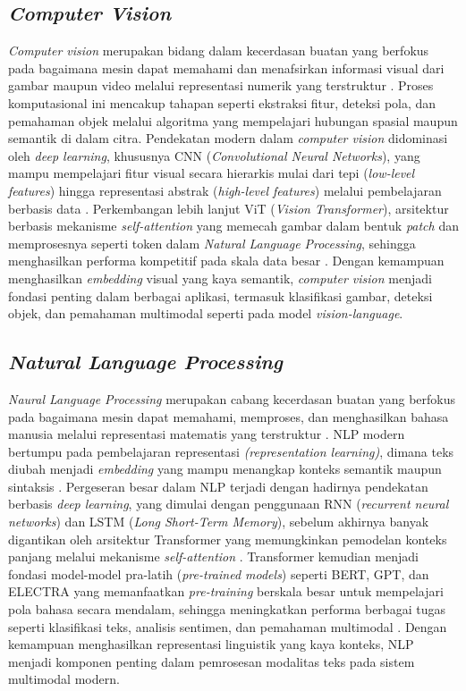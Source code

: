 \subsection{\textit{Computer Vision}} \label{II.teori2}
\textit{Computer vision} merupakan bidang dalam kecerdasan buatan yang berfokus pada bagaimana mesin dapat memahami dan menafsirkan informasi visual dari gambar maupun video melalui representasi numerik yang terstruktur \cite{sciencedirect_computer_vision_overview}. Proses komputasional ini mencakup tahapan seperti ekstraksi fitur, deteksi pola, dan pemahaman objek melalui algoritma yang mempelajari hubungan spasial maupun semantik di dalam citra. Pendekatan modern dalam \textit{computer vision} didominasi oleh \textit{deep learning}, khususnya CNN (\textit{Convolutional Neural Networks}), yang mampu mempelajari fitur visual secara hierarkis mulai dari tepi (\textit{low-level features}) hingga representasi abstrak (\textit{high-level features}) melalui pembelajaran berbasis data \cite{lecun2015deep}. Perkembangan lebih lanjut ViT (\textit{Vision Transformer}), arsitektur berbasis mekanisme \textit{self-attention} yang memecah gambar dalam bentuk \textit{patch} dan memprosesnya seperti token dalam \textit{Natural Language Processing}, sehingga menghasilkan performa kompetitif pada skala data besar \cite{dosovitskiy2020image}. Dengan kemampuan menghasilkan \textit{embedding} visual yang kaya semantik, \textit{computer vision}  menjadi fondasi penting dalam berbagai aplikasi, termasuk klasifikasi gambar, deteksi objek, dan pemahaman multimodal seperti pada model \textit{vision-language}.

\subsection{\textit{Natural Language Processing} } \label{II.teori3}
\textit{Naural Language Processing} merupakan cabang kecerdasan buatan yang berfokus pada bagaimana mesin dapat memahami, memproses, dan menghasilkan bahasa manusia melalui representasi matematis yang terstruktur \cite{jurafsky2026slp}. NLP modern bertumpu pada pembelajaran representasi \textit{(representation learning)}, dimana teks diubah menjadi \textit{embedding} yang mampu menangkap konteks semantik maupun sintaksis \cite{liu2018neural}. Pergeseran besar dalam NLP terjadi dengan hadirnya pendekatan berbasis \textit{deep learning}, yang dimulai dengan penggunaan RNN (\textit{recurrent neural networks}) dan LSTM (\textit{Long Short-Term Memory}), sebelum akhirnya banyak digantikan oleh arsitektur Transformer yang memungkinkan pemodelan konteks panjang melalui mekanisme \textit{self-attention} \cite{young2017recent}. Transformer kemudian menjadi fondasi model-model pra-latih (\textit{pre-trained models}) seperti BERT, GPT, dan ELECTRA yang memanfaatkan \textit{pre-training} berskala besar untuk mempelajari pola bahasa secara mendalam, sehingga meningkatkan performa berbagai tugas seperti klasifikasi teks, analisis sentimen, dan pemahaman multimodal \cite{devlin2018bert}. Dengan kemampuan menghasilkan representasi linguistik yang kaya konteks, NLP menjadi komponen penting dalam pemrosesan modalitas teks pada sistem multimodal modern. \par


